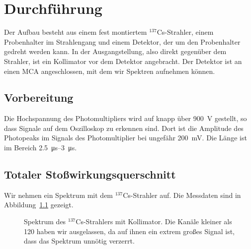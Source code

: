 \documentclass[11pt, ngerman, fleqn, DIV=15, headinclude, BCOR=2cm]{scrreprt}
\begin{document}


\chapter{Durchführung}

Der Aufbau besteht aus einem fest montiertem $^{137}$Cs-Strahler, einem
Probenhalter im Strahlengang und einem Detektor, der um den Probenhalter
gedreht werden kann. In der Ausgangstellung, also direkt gegenüber dem
Strahler, ist ein Kollimator vor dem Detektor angebracht. Der Detektor ist an
einen MCA angeschlossen, mit dem wir Spektren aufnehmen können.

\section{Vorbereitung}

Die Hochspannung des Photomultipliers wird auf knapp über \SI{900}{\volt}
gestellt, so dass Signale auf dem Oszilloskop zu erkennen sind. Dort ist die
Amplitude des Photopeaks im Signals des Photomultiplier bei ungefähr
\SI{200}{\milli\volt}. Die Länge ist im Bereich
\SIrange{2.5}{3}{\micro\second}.


\section{Totaler Stoßwirkungsquerschnitt}

Wir nehmen ein Spektrum mit dem $^{137}$Cs-Strahler auf. Die Messdaten sind in
Abbildung~\ref{fig:untergrund_roh} gezeigt.

\begin{figure}[htbp]
    \centering
    \caption{%
        Spektrum des $^{137}$Cs-Strahlers mit Kollimator. Die Kanäle kleiner
        als 120 haben wir ausgelassen, da auf ihnen ein extrem großes Signal
        ist, dass das Spektrum unnötig verzerrt.
    }
    \label{fig:untergrund_roh}
\end{figure}
\end{document}
